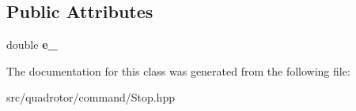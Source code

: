 \subsection*{\-Public \-Attributes}
\begin{DoxyCompactItemize}
\item 
\hypertarget{classCommand_1_1Stop_1_1QSettle_afc557df6532a4071566db3481abd9cb6}{double {\bfseries e\-\_\-}}\label{classCommand_1_1Stop_1_1QSettle_afc557df6532a4071566db3481abd9cb6}

\end{DoxyCompactItemize}


\-The documentation for this class was generated from the following file\-:\begin{DoxyCompactItemize}
\item 
src/quadrotor/command/\-Stop.\-hpp\end{DoxyCompactItemize}
